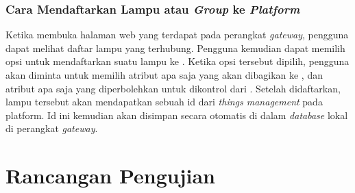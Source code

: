 \subsubsection{Cara Mendaftarkan Lampu atau \textit{Group} ke \textit{Platform}}
Ketika membuka halaman web yang terdapat pada perangkat \textit{gateway}, pengguna dapat melihat daftar lampu yang terhubung. Pengguna kemudian dapat memilih opsi untuk mendaftarkan suatu lampu ke \plat. Ketika opsi tersebut dipilih, pengguna akan diminta untuk memilih atribut apa saja yang akan dibagikan ke \plat, dan atribut apa saja yang diperbolehkan untuk dikontrol dari \plat. Setelah didaftarkan, lampu tersebut akan mendapatkan sebuah id dari \textit{things management} pada platform. Id ini kemudian akan disimpan secara otomatis di dalam \textit{database} lokal di perangkat \textit{gateway}.

\section{Rancangan Pengujian}

